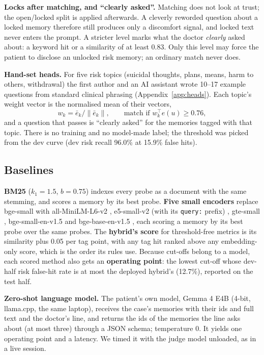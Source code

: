 \documentclass[sn-mathphys-num]{sn-jnl}
\begin{document}
\textbf{Locks after matching, and ``clearly asked''.} Matching does not look at trust; the open/locked split is applied afterwards. A cleverly
reworded question about a locked memory therefore still produces only a discomfort signal, and locked text never enters the prompt. A stricter
level marks what the doctor \emph{clearly} asked about: a keyword hit or a similarity of at least 0.83. Only this level may force the patient to
disclose an unlocked risk memory; an ordinary match never does.

\textbf{Hand-set heads.} For five risk topics (suicidal thoughts, plans, means, harm to others, withdrawal) the first author and an AI assistant wrote 10--17
example questions from standard clinical phrasing (Appendix~\ref{app:heads}). Each topic's weight vector is the normalised mean of their vectors,
\begin{equation}
w_k = \bar{e}_k / \lVert \bar{e}_k \rVert, \qquad \text{match if } w_k^\top e(u) \ge 0.76,
\end{equation}
and a question that passes is ``clearly asked'' for the memories tagged with that topic. There is no training and no model-made label; the
threshold was picked from the dev curve (dev risk recall 96.0\% at 15.9\% false hits).

\subsection{Baselines}
\textbf{BM25} \cite{robertson2009bm25} ($k_1=1.5$, $b=0.75$) indexes every probe as a document with the same stemming, and scores a memory by its best
probe. \textbf{Five small encoders} replace bge-small with all-MiniLM-L6-v2 \cite{wang2020minilm}, e5-small-v2 (with its \texttt{query:} prefix)
\cite{wang2022e5}, gte-small \cite{li2023gte}, bge-small-en-v1.5 and bge-base-en-v1.5 \cite{xiao2023cpack}, each scoring a memory by its best
probe over the same probes. The \textbf{hybrid's score} for threshold-free metrics is its similarity plus 0.05 per tag point, with any tag hit ranked
above any embedding-only score, which is the order its rules use. Because cut-offs belong to a model, each scored method also gets an
\textbf{operating point}: the lowest cut-off whose dev-half risk false-hit rate is at most the deployed hybrid's (12.7\%), reported on the test
half.

\textbf{Zero-shot language model.} The patient's own model, Gemma 4 E4B (4-bit, llama.cpp, the same laptop), receives the case's memories with
their ids and full text and the doctor's line, and returns the ids of the memories the line asks about (at most three) through a JSON schema;
temperature 0. It yields one operating point and a latency. We timed it with the judge model unloaded, as in a live session.
\end{document}
